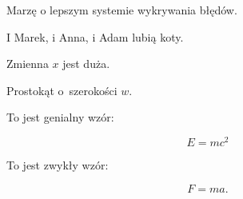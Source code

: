 \documentclass{article}
\begin{document}
Marzę o lepszym systemie wykrywania błędów.

I Marek, i  Anna, i
Adam lubią koty.

Zmienna $x$ jest duża. %

Prostokąt o~szerokości $w$.

To jest genialny wzór:

\[ E = mc^2 \]

To jest zwykły wzór:

\[ F = ma. \]
\end{document}
